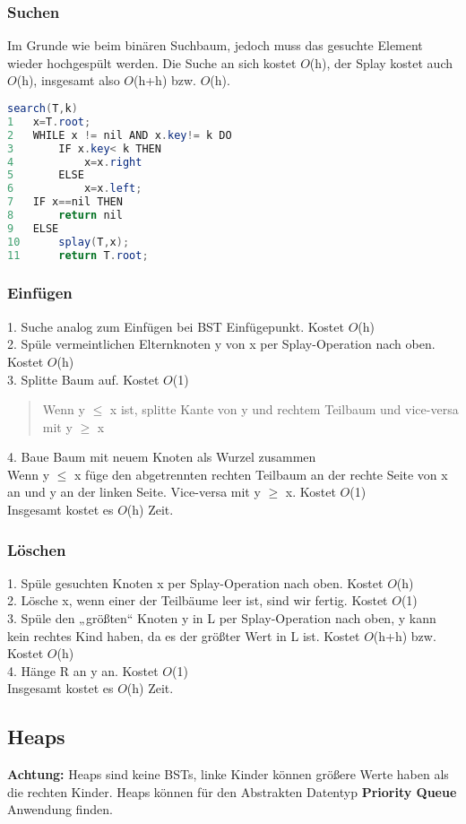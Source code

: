 \documentclass[jou,apacite]{apa6}
\begin{document}
\subsubsection{Suchen}
Im Grunde wie beim binären Suchbaum, jedoch muss das gesuchte Element wieder hochgespült werden.
Die Suche an sich kostet $O$(h), der Splay kostet auch $O$(h), insgesamt also $O$(h+h) bzw. $O$(h).
\begin{lstlisting}[language=java]
search(T,k)
1   x=T.root;
2   WHILE x != nil AND x.key!= k DO
3       IF x.key< k THEN
4           x=x.right
5       ELSE
6           x=x.left;
7   IF x==nil THEN 
8       return nil
9   ELSE
10      splay(T,x);
11      return T.root;
\end{lstlisting}
\subsubsection{Einfügen}
1. Suche analog zum Einfügen bei BST Einfügepunkt. Kostet $O$(h)  \\
2. Spüle vermeintlichen Elternknoten y von x per Splay-Operation nach oben. Kostet $O$(h)\\
3. Splitte Baum auf. Kostet $O$(1)
\begin{quote}
Wenn y $\leq $ x ist, splitte Kante von y und rechtem Teilbaum 
und vice-versa mit y $\ge $ x
\end{quote}
4. Baue Baum mit neuem Knoten als Wurzel zusammen \\
Wenn y $\leq$ x füge den abgetrennten rechten Teilbaum an der rechte Seite von x an und y an der linken Seite. Vice-versa mit y $\ge $ x. Kostet $O$(1) \\
Insgesamt kostet es $O$(h) Zeit.

\subsubsection{Löschen}
1. Spüle gesuchten Knoten x per Splay-Operation nach oben. Kostet $O$(h)\\
2. Lösche x, wenn einer der Teilbäume leer ist, sind wir fertig. Kostet $O$(1)\\
3. Spüle den „größten“ Knoten y in L per Splay-Operation nach oben, y kann kein rechtes Kind haben, da es der größter Wert in L ist. Kostet $O$(h+h) bzw. Kostet $O$(h)\\
4.  Hänge  R an y an. Kostet $O$(1)\\
Insgesamt kostet es $O$(h) Zeit.

\subsection{Heaps}
{\bfseries Achtung:} Heaps sind keine BSTs, linke Kinder können größere Werte haben als die rechten Kinder. Heaps können für den Abstrakten Datentyp {\bfseries Priority Queue} Anwendung finden.
\end{document}
